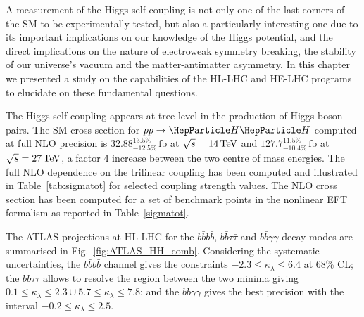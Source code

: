 \documentclass[../report.tex]{subfiles}
\providecommand{\main}{..}
\begin{document}
\label{sec:HH_Global_fit}


\label{sec:HH_implications}




\label{sec:HH_EWPT}





A measurement of the Higgs self-coupling is not only one of the last corners of the SM to be experimentally tested, but also a particularly interesting one due to its important implications on our knowledge of the Higgs potential, and the direct implications on the nature of electroweak symmetry breaking, the stability of our universe's vacuum and the matter-antimatter asymmetry. In this chapter we presented a study on the capabilities of the HL-LHC and HE-LHC programs to elucidate on these fundamental questions.

The Higgs self-coupling appears at tree level in the production of Higgs boson pairs. The SM cross section for $pp\to \HH$ computed at full NLO precision is $32.88^{13.5\%}_{-12.5\%}\,\text{fb}$ at $\sqrt{s}=14\,\text{\ensuremath{\text{TeV}}}$ and $127.7^{11.5\%}_{-10.4\%}\,\text{fb}$ at $\sqrt{s}=27\,\text{\ensuremath{\text{TeV}}}$, a factor 4 increase between the two centre of mass energies. The full NLO dependence on the trilinear coupling has been computed and illustrated in Table~\ref{tab:sigmatot} for selected coupling strength values. The NLO cross section has been computed for a set of benchmark points in the nonlinear EFT formalism as reported in Table~\ref{sigmatot}.

The ATLAS projections at HL-LHC for the $b\bar{b}b\bar{b}$, $b\bar{b}\tau\bar{\tau}$ and $b\bar{b}\gamma\gamma$ decay modes are summarised in Fig.~\ref{fig:ATLAS_HH_comb}. Considering the systematic uncertainties, the $b\bar{b}b\bar{b}$ channel gives the constraints $-2.3\leq \kappa_\lambda \leq 6.4$ at 68\% CL; the  $b\bar{b}\tau\bar{\tau}$ allows to resolve the region between the two minima giving $0.1\leq \kappa_\lambda\leq 2.3 \cup 5.7\leq \kappa_\lambda \leq 7.8$; and the $b\bar{b}\gamma\gamma$ gives the best precision with the interval $-0.2 \leq \kappa_\lambda \leq 2.5$.
\end{document}
